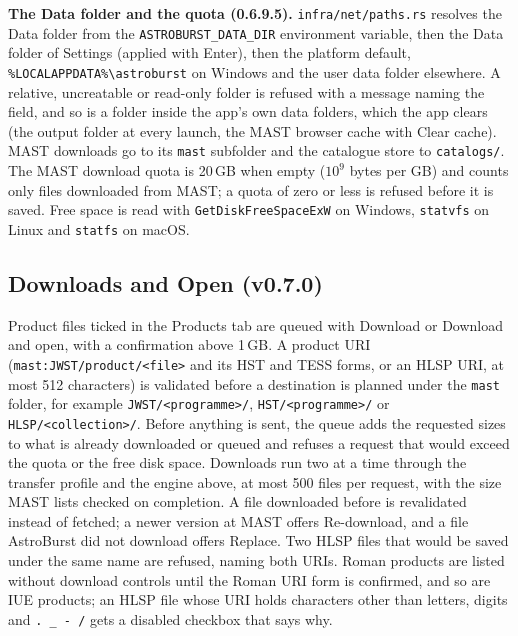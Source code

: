 \documentclass[11pt,a4paper]{article}
\newcommand{\code}[1]{\texttt{\small #1}}
\begin{document}
    \textbf{The Data folder and the quota (0.6.9.5).} \code{infra/net/paths.rs} resolves the Data folder from the \code{ASTROBURST\_DATA\_DIR} environment variable, then the Data folder of Settings (applied with Enter), then the platform default, \code{\%LOCALAPPDATA\%\textbackslash astroburst} on Windows and the user data folder elsewhere. A relative, uncreatable or read-only folder is refused with a message naming the field, and so is a folder inside the app's own data folders, which the app clears (the output folder at every launch, the MAST browser cache with Clear cache). MAST downloads go to its \code{mast} subfolder and the catalogue store to \code{catalogs/}. The MAST download quota is 20\,GB when empty ($10^9$ bytes per GB) and counts only files downloaded from MAST; a quota of zero or less is refused before it is saved. Free space is read with \code{GetDiskFreeSpaceExW} on Windows, \code{statvfs} on Linux and \code{statfs} on macOS.

    \subsection{Downloads and Open (v0.7.0)}

    Product files ticked in the Products tab are queued with Download or Download and open, with a confirmation above 1\,GB. A product URI (\code{mast:JWST/product/<file>} and its HST and TESS forms, or an HLSP URI, at most 512 characters) is validated before a destination is planned under the \code{mast} folder, for example \code{JWST/<programme>/}, \code{HST/<programme>/} or \code{HLSP/<collection>/}. Before anything is sent, the queue adds the requested sizes to what is already downloaded or queued and refuses a request that would exceed the quota or the free disk space. Downloads run two at a time through the transfer profile and the engine above, at most 500 files per request, with the size MAST lists checked on completion. A file downloaded before is revalidated instead of fetched; a newer version at MAST offers Re-download, and a file AstroBurst did not download offers Replace. Two HLSP files that would be saved under the same name are refused, naming both URIs. Roman products are listed without download controls until the Roman URI form is confirmed, and so are IUE products; an HLSP file whose URI holds characters other than letters, digits and \code{. \_ - /} gets a disabled checkbox that says why.
\end{document}
